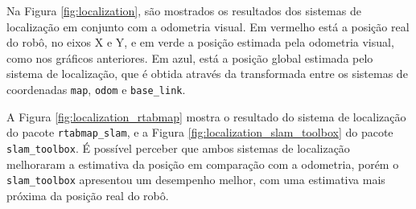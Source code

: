 \documentclass[repeatfields,xlists,xpacks,oneside,yearsonly]{ufrgscca}
\begin{document}
Na Figura \ref{fig:localization}, são mostrados os resultados dos
sistemas de localização em conjunto com a odometria visual. Em
vermelho está a posição real do robô, no eixos X e Y, e em verde a
posição estimada pela odometria visual, como nos gráficos anteriores.
Em azul, está a posição global estimada pelo sistema de localização,
que é obtida através da transformada entre os sistemas de coordenadas
\texttt{map}, \texttt{odom} e \texttt{base\_link}.

A Figura \ref{fig:localization_rtabmap} mostra o resultado do sistema
de localização do pacote \texttt{rtabmap\_slam}, e a Figura
\ref{fig:localization_slam_toolbox} do pacote \texttt{slam\_toolbox}.
É possível perceber que ambos sistemas de localização melhoraram a
estimativa da posição em comparação com a odometria, porém o
\texttt{slam\_toolbox} apresentou um desempenho melhor, com uma
estimativa mais próxima da posição real do robô.
\end{document}
